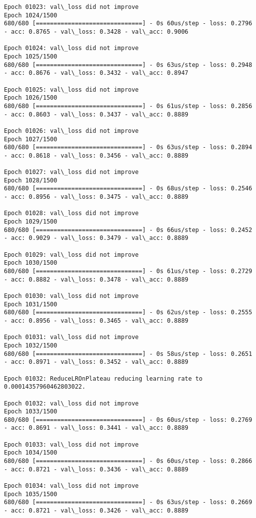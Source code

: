 \documentclass[11pt]{article}
\begin{document}
\begin{Verbatim}[commandchars=\\\{\}]
Epoch 01023: val\_loss did not improve
Epoch 1024/1500
680/680 [==============================] - 0s 60us/step - loss: 0.2796 - acc: 0.8765 - val\_loss: 0.3428 - val\_acc: 0.9006

Epoch 01024: val\_loss did not improve
Epoch 1025/1500
680/680 [==============================] - 0s 63us/step - loss: 0.2948 - acc: 0.8676 - val\_loss: 0.3432 - val\_acc: 0.8947

Epoch 01025: val\_loss did not improve
Epoch 1026/1500
680/680 [==============================] - 0s 61us/step - loss: 0.2856 - acc: 0.8603 - val\_loss: 0.3437 - val\_acc: 0.8889

Epoch 01026: val\_loss did not improve
Epoch 1027/1500
680/680 [==============================] - 0s 63us/step - loss: 0.2894 - acc: 0.8618 - val\_loss: 0.3456 - val\_acc: 0.8889

Epoch 01027: val\_loss did not improve
Epoch 1028/1500
680/680 [==============================] - 0s 68us/step - loss: 0.2546 - acc: 0.8956 - val\_loss: 0.3475 - val\_acc: 0.8889

Epoch 01028: val\_loss did not improve
Epoch 1029/1500
680/680 [==============================] - 0s 66us/step - loss: 0.2452 - acc: 0.9029 - val\_loss: 0.3479 - val\_acc: 0.8889

Epoch 01029: val\_loss did not improve
Epoch 1030/1500
680/680 [==============================] - 0s 61us/step - loss: 0.2729 - acc: 0.8882 - val\_loss: 0.3478 - val\_acc: 0.8889

Epoch 01030: val\_loss did not improve
Epoch 1031/1500
680/680 [==============================] - 0s 62us/step - loss: 0.2555 - acc: 0.8956 - val\_loss: 0.3465 - val\_acc: 0.8889

Epoch 01031: val\_loss did not improve
Epoch 1032/1500
680/680 [==============================] - 0s 58us/step - loss: 0.2651 - acc: 0.8971 - val\_loss: 0.3452 - val\_acc: 0.8889

Epoch 01032: ReduceLROnPlateau reducing learning rate to 0.00014357960462803022.

Epoch 01032: val\_loss did not improve
Epoch 1033/1500
680/680 [==============================] - 0s 60us/step - loss: 0.2769 - acc: 0.8691 - val\_loss: 0.3441 - val\_acc: 0.8889

Epoch 01033: val\_loss did not improve
Epoch 1034/1500
680/680 [==============================] - 0s 60us/step - loss: 0.2866 - acc: 0.8721 - val\_loss: 0.3436 - val\_acc: 0.8889

Epoch 01034: val\_loss did not improve
Epoch 1035/1500
680/680 [==============================] - 0s 63us/step - loss: 0.2669 - acc: 0.8721 - val\_loss: 0.3426 - val\_acc: 0.8889


\end{Verbatim}
\end{document}
